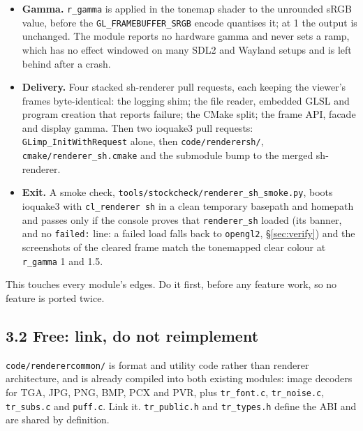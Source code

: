\documentclass[11pt,a4paper]{article}
\begin{document}
\begin{itemize}
  it needs no file beside it and no renderer pk3. Each file, \texttt{\#include}d ones too, is read
  first as \texttt{glsl/sh/<name>} through \texttt{ri.FS\_ReadFile} (loose or packed; the
  \texttt{sh/} prefix keeps it clear of \texttt{opengl2}'s \texttt{glsl/} overrides). If the
  renderer fails to build while any override was used, the whole renderer, every program, is
  rebuilt from the built-in GLSL, with a warning that gives the driver's info log and names every
  override as dropped; if that fails too, it is the fatal fallback above.
\item \textbf{Gamma.} \texttt{r\_gamma} is applied in the tonemap shader to the unrounded sRGB
  value, before the \texttt{GL\_FRAMEBUFFER\_SRGB} encode quantises it; at 1 the output is
  unchanged. The module reports no hardware gamma and never sets a ramp, which has no effect
  windowed on many SDL2 and Wayland setups and is left behind after a crash.
\item \textbf{Delivery.} Four stacked sh-renderer pull requests, each keeping the viewer's frames
  byte-identical: the logging shim; the file reader, embedded GLSL and program creation that
  reports failure; the CMake split; the frame API, facade and display gamma. Then two ioquake3 pull
  requests: \texttt{GLimp\_InitWithRequest} alone, then \texttt{code/renderersh/},
  \texttt{cmake/renderer\_sh.cmake} and the submodule bump to the merged sh-renderer.
\item \textbf{Exit.} A smoke check, \texttt{tools/stockcheck/renderer\_sh\_smoke.py}, boots
  ioquake3 with \texttt{cl\_renderer sh} in a clean temporary basepath and homepath and passes only
  if the console proves that \texttt{renderer\_sh} loaded (its banner, and no \texttt{failed:} line:
  a failed load falls back to \texttt{opengl2}, §\ref{sec:verify}) and the screenshots of the
  cleared frame match the tonemapped clear colour at \texttt{r\_gamma} 1 and 1.5.
\end{itemize}
This touches every module's edges. Do it first, before any feature work, so no feature is ported
twice.

\subsection{3.2 Free: link, do not reimplement}

\texttt{code/renderercommon/} is format and utility code rather than renderer architecture, and is
already compiled into both existing modules: image decoders for TGA, JPG, PNG, BMP, PCX and PVR,
plus \texttt{tr\_font.c}, \texttt{tr\_noise.c}, \texttt{tr\_subs.c} and \texttt{puff.c}. Link it.
\texttt{tr\_public.h} and \texttt{tr\_types.h} define the ABI and are shared by definition.
\end{document}
